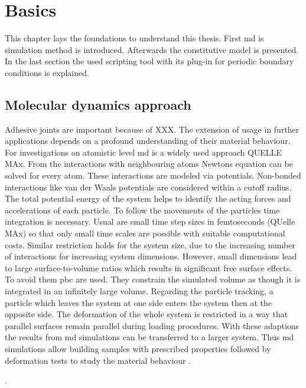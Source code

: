 \chapter{Basics}
This chapter lays the foundations to understand this thesis. First \acrfull{md} is simulation method is introduced. Afterwards the constitutive model is presented. In the last section the used scripting tool with its plug-in for periodic boundary conditions is explained.  

\section{Molecular dynamics approach}
Adhesive joints are important because of XXX. The extension of usage in further applications depends on a profound understanding of their material behaviour. For investigations on atomistic level \acrfull{md} is a widely used approach QUELLE MAx. From the interactions with neighbouring atoms Newtons equation can be solved for every atom. These interactions are modeled via potentials. Non-bonded interactions like van der Waals potentials are considered within a cutoff radius. The total potential energy of the system helps to identify the acting forces and accelerations of each particle. To follow the movements of the particles time integration is necessary. Usual are small time step sizes in femtoseconds (QUelle MAx) so that only small time scales are possible with suitable computational costs. Similar restriction holds for the system size, due to the increasing number of interactions for increasing system dimensions. However, small dimensions lead to large surface-to-volume ratios which results in significant free surface effects. To avoid them \acrfull{pbc} are used. They constrain the simulated volume as though it is integrated in an infinitely large volume. Regarding the particle tracking, a particle which leaves the system at one side enters the system then at the opposite side. The deformation of the whole system is restricted in a way that parallel surfaces remain parallel during loading procedures. With these adaptions the results from \acrshort{md} simulations can be transferred to a larger system. Thus \acrshort{md} simulations allow building samples with prescribed properties followed by deformation tests to study the material behaviour \cite{buyukozturk_structural_2011}. 

. 

